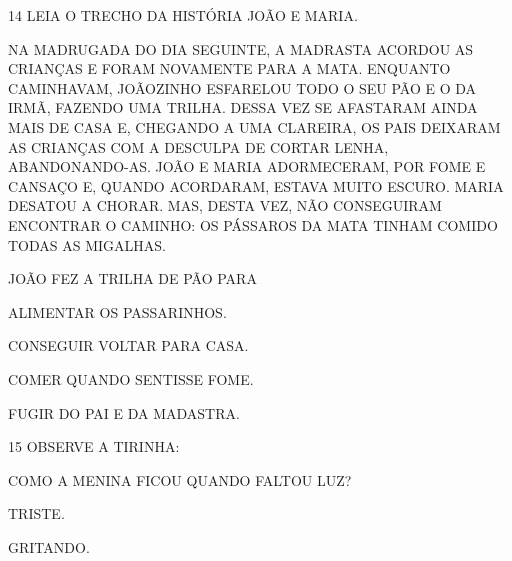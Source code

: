 \begin{escola}
{

\num{14} LEIA O TRECHO DA HISTÓRIA JOÃO E MARIA.

NA MADRUGADA DO DIA SEGUINTE, A MADRASTA ACORDOU AS CRIANÇAS E FORAM
NOVAMENTE PARA A MATA. ENQUANTO CAMINHAVAM, JOÃOZINHO ESFARELOU TODO O
SEU PÃO E O DA IRMÃ, FAZENDO UMA TRILHA. DESSA VEZ SE AFASTARAM AINDA
MAIS DE CASA E, CHEGANDO A UMA CLAREIRA, OS PAIS DEIXARAM AS CRIANÇAS
COM A DESCULPA DE CORTAR LENHA, ABANDONANDO-AS. JOÃO E MARIA
ADORMECERAM, POR FOME E CANSAÇO E, QUANDO ACORDARAM, ESTAVA MUITO
ESCURO. MARIA DESATOU A CHORAR. MAS, DESTA VEZ, NÃO CONSEGUIRAM
ENCONTRAR O CAMINHO: OS PÁSSAROS DA MATA TINHAM COMIDO TODAS AS
MIGALHAS.


JOÃO FEZ A TRILHA DE PÃO PARA

\begin{escolha}
\item ALIMENTAR OS PASSARINHOS.

\item CONSEGUIR VOLTAR PARA CASA.

\item COMER QUANDO SENTISSE FOME.

\item FUGIR DO PAI E DA MADASTRA.
\end{escolha}


\num{15} OBSERVE A TIRINHA:



COMO A MENINA FICOU QUANDO FALTOU LUZ?

\begin{escolha}
\item TRISTE.

\item GRITANDO.


\end{escolha}}
\end{escola}
